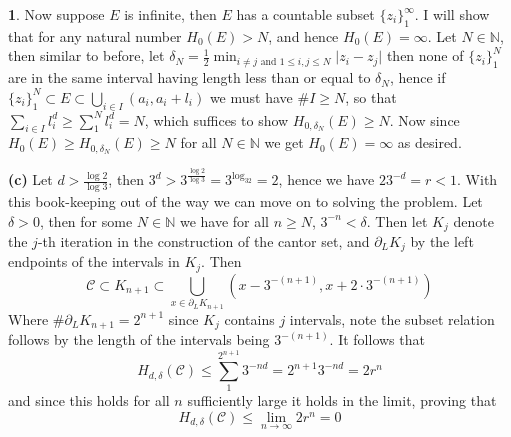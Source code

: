 \documentclass[10.5pt]{article}
\theoremstyle{definition}
\newtheorem{pb}{}
\newcommand{\set}[1]{\{#1\}}
\newcommand{\abs}[1]{\lvert#1\rvert}
\newcommand{\tand}{\text{ and }}
\begin{document}
\begin{pb}
        Now suppose \(E\)  is infinite, then \(E\) has a countable subset \(\set{z_i}_1^\infty\). I will show that for any natural number \(H_0(E) > N\), and hence \(H_0(E) = \infty\).
        Let \(N \in \mathbb{N}\), then similar to before, let \newline \(\delta_N = \frac12 \min_{i \neq j \tand 1 \leq i,j \leq N}\abs{z_i - z_j}\)
        then none of \(\set{z_i}_1^N\) are in the same interval having length less than or equal to \(\delta_N\), hence if \(\set{z_i}_1^N \subset E \subset \bigcup_{i \in I}(a_i,a_i + l_i)\)
        we must have \(\# I \geq N\), so that \(\sum_{i \in I} l_i^d \geq \sum_1^N l_i^d = N\), which suffices to show \(H_{0,\delta_N}(E) \geq N\). 
        Now since \(H_0 (E)\geq H_{0,\delta_N}(E) \geq N\) for all \(N \in \mathbb{N}\) we get \(H_0(E) = \infty\) as desired. 

        \textbf{(c)} Let \(d > \frac{\log2}{\log3}\), then \(3^d > 3^{\frac{\log2}{\log3}} = 3^{\log_32} = 2\), hence we have \(23^{-d} = r < 1\). With this book-keeping out of the way we can
        move on to solving the problem. Let \(\delta > 0\), then for some \(N \in \mathbb{N}\) we have for all \(n \geq N\), \(3^{-n} < \delta\). Then let \(K_j\) denote the \(j\)-th iteration in the construction of the cantor set, and
        \(\partial_L K_j\) by the left endpoints of the intervals in \(K_j\). Then 
        \[\mathcal{C} \subset K_{n+1} \subset \bigcup_{x \in \partial_L K_{n+1}}(x - 3^{-(n+1)}, x + 2\cdot3^{-(n+1)})\]
        Where \(\# \partial_L K_{n+1} = 2^{n+1}\) since \(K_j\) contains \(j\) intervals, note the subset relation follows by the length of the intervals being \(3^{-(n+1)}\).
        It follows that 
        \[H_{d,\delta}(\mathcal{C}) \leq \sum_1^{2^{n+1}}3^{-nd} = 2^{n+1}3^{-nd} = 2r^n\]
        and since this holds for all \(n\) sufficiently large it holds in the limit, proving that
        \[H_{d,\delta}(\mathcal{C}) \leq \lim_{n\to\infty}2r^n = 0\]
    \end{pb}
\end{document}
